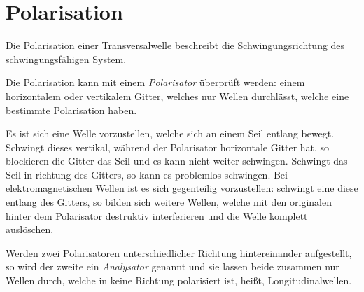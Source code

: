 \documentclass{article}
\begin{document}
\section{Polarisation}
Die Polarisation einer Transversalwelle beschreibt die Schwingungsrichtung des schwingungsfähigen System.
 
Die Polarisation kann mit einem \emph{Polarisator} überprüft werden: einem horizontalem oder vertikalem Gitter, welches nur Wellen durchlässt, welche eine bestimmte Polarisation haben.
 
Es ist sich eine Welle vorzustellen, welche sich an einem Seil entlang bewegt. Schwingt dieses vertikal, während der Polarisator horizontale Gitter hat, so blockieren die Gitter das Seil und es kann nicht weiter schwingen. Schwingt das Seil in richtung des Gitters, so kann es problemlos schwingen. Bei elektromagnetischen Wellen ist es sich gegenteilig vorzustellen: schwingt eine diese entlang des Gitters, so bilden sich weitere Wellen, welche mit den originalen hinter dem Polarisator destruktiv interferieren und die Welle komplett auslöschen.  
 
Werden zwei Polarisatoren unterschiedlicher Richtung hintereinander aufgestellt, so wird der zweite ein \emph{Analysator} genannt und sie lassen beide zusammen nur Wellen durch, welche in keine Richtung polarisiert ist, heißt, Longitudinalwellen.
\end{document}
